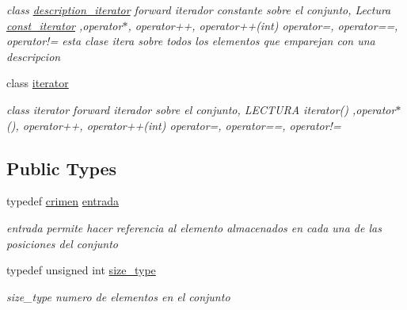 \begin{DoxyCompactItemize}
\begin{DoxyCompactList}\small\item\em class \hyperlink{classconjunto_1_1description__iterator}{description\+\_\+iterator} forward iterador constante sobre el conjunto, Lectura \hyperlink{classconjunto_1_1const__iterator}{const\+\_\+iterator} ,operator$\ast$, operator++, operator++(int) operator=, operator==, operator!= esta clase itera sobre todos los elementos que emparejan con una descripcion \end{DoxyCompactList}\item 
class \hyperlink{classconjunto_1_1iterator}{iterator}
\begin{DoxyCompactList}\small\item\em class iterator forward iterador sobre el conjunto, L\+E\+C\+T\+U\+R\+A iterator() ,operator$\ast$(), operator++, operator++(int) operator=, operator==, operator!= \end{DoxyCompactList}\end{DoxyCompactItemize}
\subsection*{Public Types}
\begin{DoxyCompactItemize}
\item 
\hypertarget{classconjunto_a09cad766dd65de73e51eae21f9d22585}{}typedef \hyperlink{classcrimen}{crimen} \hyperlink{classconjunto_a09cad766dd65de73e51eae21f9d22585}{entrada}\label{classconjunto_a09cad766dd65de73e51eae21f9d22585}

\begin{DoxyCompactList}\small\item\em entrada permite hacer referencia al elemento almacenados en cada una de las posiciones del conjunto \end{DoxyCompactList}\item 
\hypertarget{classconjunto_a855a5893bb0f5a851ab2dbf2b8aa6cc7}{}typedef unsigned int \hyperlink{classconjunto_a855a5893bb0f5a851ab2dbf2b8aa6cc7}{size\+\_\+type}\label{classconjunto_a855a5893bb0f5a851ab2dbf2b8aa6cc7}

\begin{DoxyCompactList}\small\item\em size\+\_\+type numero de elementos en el conjunto \end{DoxyCompactList}\end{DoxyCompactItemize}
